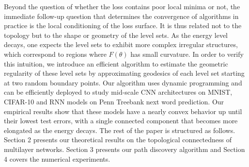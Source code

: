 Beyond the question of whether the loss contains poor local minima or not, the immediate follow-up question that determines the convergence of algorithms in practice is the local conditioning of the loss surface. It is thus related not to the topology but to the shape or geometry of the level sets. As the energy level decays, one expects the level sets to exhibit more complex irregular structures, which correspond to regions where $F(\theta)$ has small curvature. In order to verify this intuition, we introduce an efficient algorithm to estimate the geometric regularity of these level sets by approximating geodesics of each level set starting at two random boundary points. Our algorithm uses dynamic programming and can be efficiently deployed to study mid-scale CNN architectures on MNIST, CIFAR-10 and RNN models on Penn Treebank next word prediction. 
Our empirical results show that these models have a nearly convex behavior up until their lowest test errors, with a single connected component that becomes more elongated as the energy decays. 
The rest of the paper is structured as follows. Section 2 presents our theoretical results on the topological connectedness of multilayer networks. Section 3 presents our path discovery algorithm and Section 4 covers the numerical experiments.













